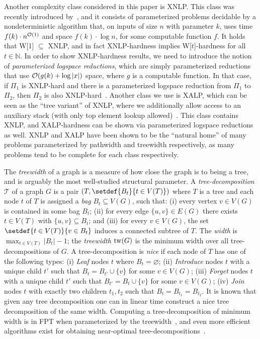Another complexity class considered in this paper is XNLP.
This class was recently introduced by~\cite{iandc/BodlaenderGNS24},
and it consists of parameterized problems decidable by a nondeterministic algorithm that,
on inputs of size $n$ with parameter $k$, uses time $f(k) \cdot n^{\mathcal{O}(1)}$ and space
$f(k) \cdot \log n$, for some computable function $f$.
It holds that W[1] $\subseteq$ XNLP,
and in fact XNLP-hardness implies W[$t$]-hardness for all $t \in \mathbb{N}$.
In order to show XNLP-hardness results, we need to introduce the notion of
\emph{parameterized logspace reductions}, which are simply
parameterized reductions that use $\mathcal{O}(g(k) + \log |x|)$ space,
where $g$ is a computable function.
In that case, if $\Pi_1$ is XNLP-hard and there is a parameterized logspace reduction from $\Pi_1$ to $\Pi_2$,
then $\Pi_2$ is also XNLP-hard~\cite{iandc/BodlaenderGNS24}.
Another class we use is XALP, which can be seen as the ``tree variant'' of XNLP,
where we additionally allow access to an auxiliary stack (with only top element lookup allowed)~\cite{iwpec/BodlaenderGJPP22}.
This class contains XNLP, and XALP-hardness can be shown via parameterized logspace reductions as well.
XNLP and XALP have been shown to be the ``natural home'' of many problems parameterized by pathwidth and treewidth respectively,
as many problems tend to be complete for each class respectively.

The \emph{treewidth} of a graph is a measure of how close the graph is to being a tree, and is arguably the most well-studied structural parameter.
A \emph{tree-decomposition} $\mathcal{T}$ of a graph $G$ is a pair $(T,\setdef{B_t}{t \in V(T)})$ where
$T$ is a tree and each node $t$ of $T$ is assigned a \emph{bag} $B_t \subseteq V(G)$,
such that: (i) every vertex $v \in V(G)$ is contained in some bag $B_t$; (ii) for every edge $\{u,v\} \in E(G)$ there exists $t \in V(T)$ with
$\{u,v\} \subseteq B_t$; and
(iii) for every $v \in V(G)$, the set $\setdef{t \in V(T)}{v \in B_t}$ induces a connected subtree of $T$.
The \emph{width} is $\max_{t \in V(T)} |B_t|-1$;
the \emph{treewidth} $\mathrm{tw}(G)$ is the minimum width over all tree-decompositions of $G$.
A tree-decomposition is \emph{nice} if each node of $T$ has one of the following types:
(i) \emph{Leaf} nodes $t$ where $B_t = \varnothing$;
(ii) \emph{Introduce} nodes $t$ with a unique child $t'$ such that $B_t = B_{t'} \cup \{v\}$ for some $v \in V(G)$;
(iii) \emph{Forget} nodes $t$ with a unique child $t'$ such that $B_{t'} = B_t \cup \{v\}$ for some $v \in V(G)$;
(iv) \emph{Join} nodes $t$ with exactly two children $t_1,t_2$ such that $B_t = B_{t_1} = B_{t_2}$.
It is known that given any tree
decomposition one can in linear time construct a nice tree decomposition of the same width.
Computing a tree-decomposition of minimum width is in FPT when parameterized by the treewidth~\cite{siamcomp/Bodlaender96,books/Kloks94,stoc/KorhonenL23},
and even more efficient algorithms exist for obtaining near-optimal tree-decompositions~\cite{focs/Korhonen21}.



